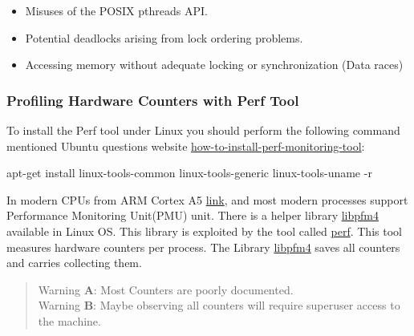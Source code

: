 \documentclass[
]{article}
\newenvironment{Shaded}{}{}
\newcommand{\AttributeTok}[1]{\textcolor[rgb]{0.49,0.56,0.16}{#1}}
\newcommand{\ExtensionTok}[1]{#1}
\newcommand{\FunctionTok}[1]{\textcolor[rgb]{0.02,0.16,0.49}{#1}}
\newcommand{\KeywordTok}[1]{\textcolor[rgb]{0.00,0.44,0.13}{\textbf{#1}}}
\newcommand{\NormalTok}[1]{#1}
\begin{document}
\begin{itemize}
\item
  Misuses of the POSIX pthreads API.
\item
  Potential deadlocks arising from lock ordering problems.
\item
  Accessing memory without adequate locking or synchronization (Data
  races)
\end{itemize}

\hypertarget{profiling-hardware-counters-with-perf-tool}{%
\subsubsection{Profiling Hardware Counters with Perf
Tool}\label{profiling-hardware-counters-with-perf-tool}}

To install the Perf tool under Linux you should perform the following
command mentioned Ubuntu questions website
\href{https://askubuntu.com/questions/50145/how-to-install-perf-monitoring-tool}{how-to-install-perf-monitoring-tool}:

\begin{Shaded}
\begin{Highlighting}[]
\ExtensionTok{apt{-}get}\NormalTok{ install linux{-}tools{-}common linux{-}tools{-}generic linux{-}tools{-}}\KeywordTok{\textasciigrave{}}\FunctionTok{uname} \AttributeTok{{-}r}\KeywordTok{\textasciigrave{}}
\end{Highlighting}
\end{Shaded}

In modern CPUs from ARM Cortex A5
\href{https://developer.arm.com/documentation/ddi0434/c/performance-monitoring-unit/about-the-performance-monitoring-unit?lang=en}{link},
and most modern processes support Performance Monitoring Unit(PMU) unit.
There is a helper library
\href{https://man7.org/linux/man-pages/man3/libpfm.3.html}{libpfm4}
available in Linux OS. This library is exploited by the tool called
\href{https://perf.wiki.kernel.org/index.php/Main_Page}{perf}. This tool
measures hardware counters per process. The Library
\href{https://man7.org/linux/man-pages/man3/libpfm.3.html}{libpfm4}
saves all counters and carries collecting them.

\begin{quote}
Warning \textbf{A}: Most Counters are poorly documented.\\
Warning \textbf{B}: Maybe observing all counters will require superuser
access to the machine.
\end{quote}
\end{document}
